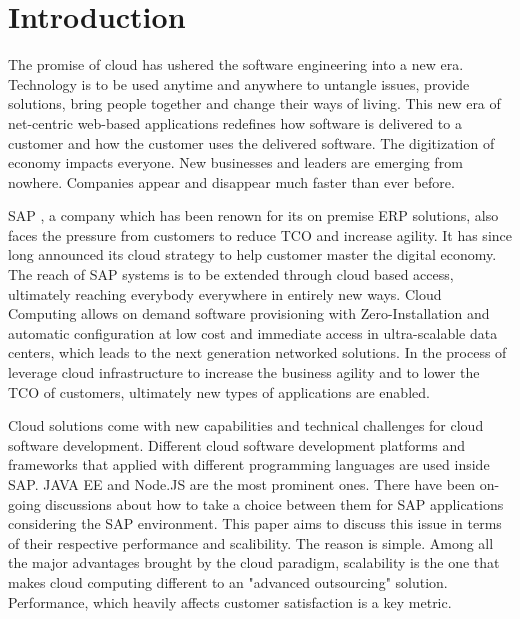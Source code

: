 \chapter{Introduction}
The promise of cloud has ushered the software engineering into a new era. Technology is to be used anytime and anywhere to untangle issues, provide solutions, bring people together and change their ways of living. This new era of net-centric web-based applications redefines how software is delivered to a customer and how the customer uses the delivered software. The digitization of economy impacts everyone. New businesses and leaders are emerging from nowhere. Companies appear and disappear much faster than ever before. 

SAP , a company which has been renown for its on premise ERP solutions, also faces the pressure from customers to reduce TCO and increase agility. It has since long announced its cloud strategy to help customer master the digital economy. The reach of SAP systems is to be extended through cloud based access, ultimately reaching everybody everywhere in entirely new ways. Cloud Computing allows on demand software provisioning with Zero-Installation and automatic configuration at low cost and immediate access in ultra-scalable data centers, which leads to the next generation networked solutions. In the process of leverage cloud infrastructure to increase the business agility and to lower the TCO of customers, ultimately new types of applications are enabled.

Cloud solutions come with new capabilities and technical challenges for cloud software development.  Different cloud software development platforms and frameworks that applied with different programming languages are used inside SAP. JAVA EE and Node.JS are the most prominent ones. There have been on-going discussions about how to  take a choice between them for SAP applications considering the SAP environment. This paper aims to discuss this issue in terms of their respective performance and scalibility. The reason is simple. Among all the major advantages brought by the cloud paradigm, scalability is the one that makes cloud computing different to an "advanced outsourcing" solution. Performance, which heavily affects customer satisfaction is a key metric. \\



